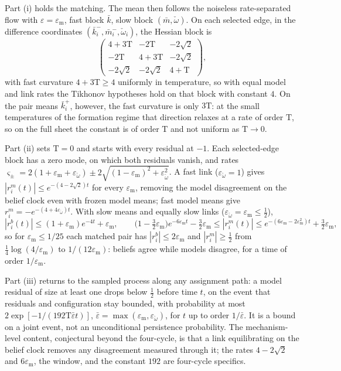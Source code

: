 Part (i) holds the matching. The mean then follows the noiseless rate-separated flow with
$\varepsilon=\varepsilon_{\mathrm m}$, fast block $\bar k$, slow block $(\bar m,\check\omega)$. On each
selected edge, in the difference coordinates $(\bar k^-_i,\bar m^-_i,\check\omega_i)$, the Hessian block
is
\[
\begin{pmatrix}4+3\mathrm T&-2\mathrm T&-2\sqrt2\\-2\mathrm T&4+3\mathrm T&-2\sqrt2\\
-2\sqrt2&-2\sqrt2&4+\mathrm T\end{pmatrix},
\]
with fast curvature $4+3\mathrm T\geq4$ uniformly in temperature, so with equal model and link rates
the Tikhonov hypotheses hold on that block with constant $4$. On the pair means $\bar k^+_i$, however,
the fast curvature is only $3\mathrm T$: at the small temperatures of the formation regime that
direction relaxes at a rate of order $\mathrm T$, so on the full sheet the constant is of order
$\mathrm T$ and not uniform as $\mathrm T\to0$.

Part (ii) sets $\mathrm T=0$ and starts with every residual at $-1$. Each selected-edge block has a zero
mode, on which both residuals vanish, and rates
$\varsigma_\pm=2(1+\varepsilon_{\mathrm m}+\varepsilon_{\check\omega})\pm2\sqrt{(1-\varepsilon_{\mathrm m})^2
+\varepsilon_{\check\omega}^2}$. A fast link ($\varepsilon_{\check\omega}=1$) gives
$|r^m_i(t)|\leq e^{-(4-2\sqrt2)t}$ for every $\varepsilon_{\mathrm m}$, removing the model disagreement
on the belief clock even with frozen model means; fast model means give
$r^m_i=-e^{-(4+4\varepsilon_{\check\omega})t}$. With slow means and equally slow links
($\varepsilon_{\check\omega}=\varepsilon_{\mathrm m}\leq\tfrac12$),
\[
|r^b_i(t)|\leq(1+\varepsilon_{\mathrm m})e^{-4t}+\varepsilon_{\mathrm m},
\qquad
\bigl(1-\tfrac32\varepsilon_{\mathrm m}\bigr)e^{-6\varepsilon_{\mathrm m}t}-\tfrac32\varepsilon_{\mathrm m}
\leq|r^m_i(t)|\leq e^{-(6\varepsilon_{\mathrm m}-2\varepsilon_{\mathrm m}^2)t}+\tfrac32\varepsilon_{\mathrm m},
\]
so for $\varepsilon_{\mathrm m}\leq1/25$ each matched pair has $|r^b_i|\leq2\varepsilon_{\mathrm m}$ and
$|r^m_i|\geq\tfrac12$ from $\tfrac14\log(4/\varepsilon_{\mathrm m})$ to $1/(12\varepsilon_{\mathrm m})$:
beliefs agree while models disagree, for a time of order $1/\varepsilon_{\mathrm m}$.

Part (iii) returns to the sampled process along any assignment path: a model residual of size at least
one drops below $\tfrac12$ before time $t$, on the event that residuals and configuration stay bounded,
with probability at most $2\exp[-1/(192\mathrm T\bar\varepsilon t)]$,
$\bar\varepsilon=\max(\varepsilon_{\mathrm m},\varepsilon_{\check\omega})$, for $t$ up to order
$1/\bar\varepsilon$. It is a bound on a joint event, not an unconditional persistence probability. The
mechanism-level content, conjectural beyond the four-cycle, is that a link equilibrating on the belief
clock removes any disagreement measured through it; the rates $4-2\sqrt2$ and $6\varepsilon_{\mathrm
m}$, the window, and the constant $192$ are four-cycle specifics.

